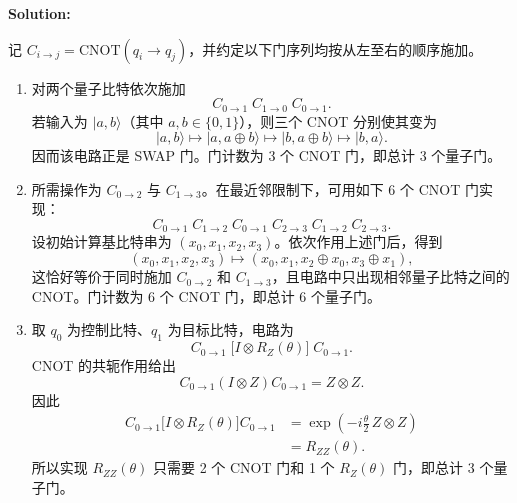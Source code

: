 \documentclass{ctexart}
\newcommand{\ket}[1]{|#1\rangle}
\begin{document}
\medskip
\noindent\textbf{Solution:}

记 $C_{i\to j}=\mathrm{CNOT}(q_i\to q_j)$，并约定以下门序列均按从左至右的顺序施加。

\begin{enumerate}
    \item[(a)] 对两个量子比特依次施加
    \begin{equation*}
        C_{0\to1}\;C_{1\to0}\;C_{0\to1}.
    \end{equation*}
    若输入为 $\ket{a,b}$（其中 $a,b\in\{0,1\}$），则三个 CNOT 分别使其变为
    \begin{equation*}
        \ket{a,b}\longmapsto\ket{a,a\oplus b}
        \longmapsto\ket{b,a\oplus b}
        \longmapsto\ket{b,a}.
    \end{equation*}
    因而该电路正是 SWAP 门。门计数为 3 个 CNOT 门，即总计 3 个量子门。

    \item[(b)] 所需操作为 $C_{0\to2}$ 与 $C_{1\to3}$。在最近邻限制下，可用如下 6 个 CNOT 门实现：
    \begin{equation*}
        C_{0\to1}\;C_{1\to2}\;C_{0\to1}\;C_{2\to3}\;C_{1\to2}\;C_{2\to3}.
    \end{equation*}
    设初始计算基比特串为 $(x_0,x_1,x_2,x_3)$。依次作用上述门后，得到
    \begin{equation*}
        (x_0,x_1,x_2,x_3)
        \longmapsto (x_0,x_1,x_2\oplus x_0,x_3\oplus x_1),
    \end{equation*}
    这恰好等价于同时施加 $C_{0\to2}$ 和 $C_{1\to3}$，且电路中只出现相邻量子比特之间的 CNOT。门计数为 6 个 CNOT 门，即总计 6 个量子门。

    \item[(c)] 取 $q_0$ 为控制比特、$q_1$ 为目标比特，电路为
    \begin{equation*}
        C_{0\to1}\;\bigl[I\otimes R_Z(\theta)\bigr]\;C_{0\to1}.
    \end{equation*}
    CNOT 的共轭作用给出
    \begin{equation*}
        C_{0\to1}(I\otimes Z)C_{0\to1}=Z\otimes Z.
    \end{equation*}
    因此
    \begin{align*}
        C_{0\to1}\bigl[I\otimes R_Z(\theta)\bigr]C_{0\to1}
        &= \exp\!\left(-i\frac{\theta}{2}\,Z\otimes Z\right) \\
        &= R_{ZZ}(\theta).
    \end{align*}
    所以实现 $R_{ZZ}(\theta)$ 只需要 2 个 CNOT 门和 1 个 $R_Z(\theta)$ 门，即总计 3 个量子门。


\end{enumerate}
\end{document}
